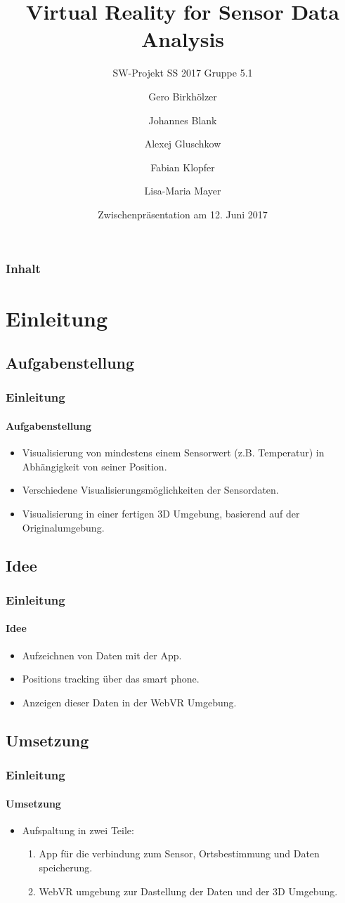 \documentclass{beamer}
\title{Virtual Reality for Sensor Data Analysis}
\subtitle{SW-Projekt SS 2017 Gruppe 5.1}
\author{Gero Birkh\"olzer \and Johannes Blank \and Alexej Gluschkow \\ \and Fabian Klopfer \and Lisa-Maria Mayer}
\date{Zwischenpr\"asentation am 12. Juni 2017}
\begin{document}
\frame{\titlepage}



\begin{frame}
  \frametitle{Inhalt}
  \tableofcontents%
\end{frame}


\section{Einleitung}

\subsection{Aufgabenstellung}

\begin{frame}
\frametitle{Einleitung}
\framesubtitle{Aufgabenstellung}
\begin{itemize}
	\item Visualisierung von mindestens einem Sensorwert (z.B. Temperatur) in Abhängigkeit von seiner Position.
	\item Verschiedene Visualisierungsmöglichkeiten der Sensordaten.
	\item Visualisierung in einer fertigen 3D Umgebung, basierend auf der Originalumgebung.
\end{itemize}
\end{frame}

\subsection{Idee} %

\begin{frame}
\frametitle{Einleitung}
\framesubtitle{Idee}
\begin{itemize}
	\item Aufzeichnen von Daten mit der App.
  \item Positions tracking \"uber das smart phone.
  \item Anzeigen dieser Daten in der WebVR Umgebung.
\end{itemize}
\end{frame}

\subsection{Umsetzung} %

\begin{frame}
\frametitle{Einleitung}
\framesubtitle{Umsetzung}
\begin{itemize}
	\item Aufspaltung in zwei Teile: \pause
  \begin{enumerate}
    \item App f\"ur die verbindung zum Sensor, Ortsbestimmung und Daten speicherung.
    \item WebVR umgebung zur Dastellung der Daten und der 3D Umgebung.
  \end{enumerate}
\end{itemize}
\end{frame}
\end{document}
